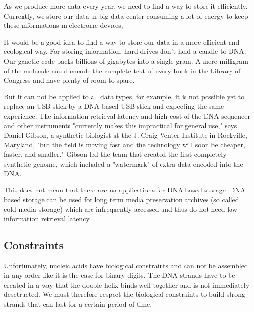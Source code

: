 
As we produce more data every year, we need to find a way to store it efficiently. Currently, we store our data in big data center consuming a lot of energy to keep these informations in electronic devices, 

It would be a good idea to find a way to store our data in a more efficient and ecological way. For storing information, hard drives don't hold a candle to DNA. Our genetic code packs billions of gigabytes into a single gram. A mere milligram of the molecule could encode the complete text of every book in the Library of Congress and have plenty of room to spare. \cite{bib:dna_data_storage}


But it can not be applied to all data types, for example, it is not possible yet to replace an USB stick by a DNA based USB stick and expecting the same experience. The information retrieval latency and high cost of the DNA sequencer and other instruments "currently makes this impractical for general use," says Daniel Gibson, a synthetic biologist at the J. Craig Venter Institute in Rockville, Maryland, "but the field is moving fast and the technology will soon be cheaper, faster, and smaller." Gibson led the team that created the first completely synthetic genome, which included a "watermark" of extra data encoded into the DNA. \cite{bib:dna_data_storage}

This does not mean that there are no applications for DNA based storage. DNA based storage can be used for long term media preservation archives (so called cold media storage) which are infrequently accessed and thus do not need low information retrieval latency.


\subsection{Constraints}

Unfortunately, nucleic acids have biological constraints and can not be assembled in any order like it is the case for binary digits. The DNA strands have to be created in a way that the double helix binds well together and is not immediately desctructed. We must therefore respect the biological constraints to build strong strands that can last for a certain period of time. 

